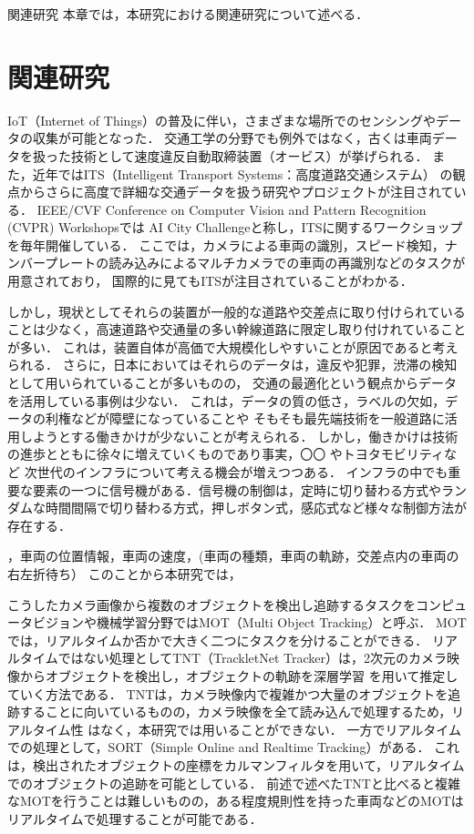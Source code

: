 \chapterhead
{関連研究}
{本章では，本研究における関連研究について述べる．}

\section{関連研究}
IoT（Internet of Things）の普及に伴い，さまざまな場所でのセンシングやデータの収集が可能となった．
交通工学の分野でも例外ではなく，古くは車両データを扱った技術として速度違反自動取締装置（オービス）が挙げられる．
また，近年ではITS（Intelligent Transport Systems：高度道路交通システム）
の観点からさらに高度で詳細な交通データを扱う研究やプロジェクトが注目されている．
IEEE/CVF Conference on Computer Vision and Pattern Recognition (CVPR) Workshopsでは
AI City Challenge\cite{Naphade_2020_CVPR_Workshops}と称し，ITSに関するワークショップを毎年開催している．
ここでは，カメラによる車両の識別，スピード検知，ナンバープレートの読み込みによるマルチカメラでの車両の再識別などのタスクが用意されており，
国際的に見てもITSが注目されていることがわかる．

しかし，現状としてそれらの装置が一般的な道路や交差点に取り付けられていることは少なく，高速道路や交通量の多い幹線道路に限定し取り付けれていることが多い．
これは，装置自体が高価で大規模化しやすいことが原因であると考えられる．
さらに，日本においてはそれらのデータは，違反や犯罪，渋滞の検知として用いられていることが多いものの，
交通の最適化という観点からデータを活用している事例は少ない．
これは，データの質の低さ，ラベルの欠如，データの利権などが障壁になっていることや
そもそも最先端技術を一般道路に活用しようとする働きかけが少ないことが考えられる．
しかし，働きかけは技術の進歩とともに徐々に増えていくものであり事実，〇〇 %
やトヨタモビリティなど
次世代のインフラについて考える機会が増えつつある．
インフラの中でも重要な要素の一つに信号機がある．信号機の制御は，定時に切り替わる方式やランダムな時間間隔で切り替わる方式，押しボタン式，感応式など様々な制御方法が存在する．

，車両の位置情報，車両の速度，(車両の種類，車両の軌跡，交差点内の車両の右左折待ち）
このことから本研究では，

こうしたカメラ画像から複数のオブジェクトを検出し追跡するタスクをコンピュータビジョンや機械学習分野ではMOT（Multi Object Tracking）と呼ぶ．
MOTでは，リアルタイムか否かで大きく二つにタスクを分けることができる．
リアルタイムではない処理としてTNT（TrackletNet Tracker）は，2次元のカメラ映像からオブジェクトを検出し，オブジェクトの軌跡を深層学習
を用いて推定していく方法である．\cite{wang2019exploit} \cite{tang2018single} TNTは，カメラ映像内で複雑かつ大量のオブジェクトを追跡することに向いているものの，カメラ映像を全て読み込んで処理するため，リアルタイム性
はなく，本研究では用いることができない．
一方でリアルタイムでの処理として，SORT（Simple Online and Realtime Tracking）がある．\cite{bewley2016simple} \cite{wojke2017simple}
これは，検出されたオブジェクトの座標をカルマンフィルタ\cite{kalman1960new}を用いて，リアルタイムでのオブジェクトの追跡を可能としている．
前述で述べたTNTと比べると複雑なMOTを行うことは難しいものの，ある程度規則性を持った車両などのMOTはリアルタイムで処理することが可能である．

\newpage
